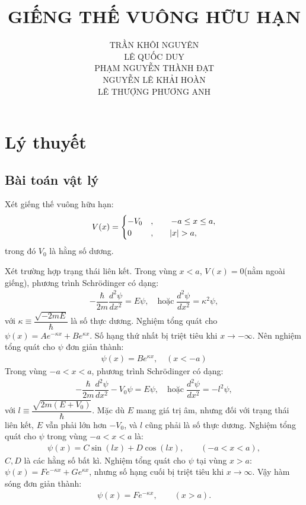 \documentclass{article}
\title{\Huge{GIẾNG THẾ VUÔNG HỮU HẠN}}
\begin{document}
	\setlength{\parindent}{20pt}
	\newpage
	\author{TRẦN KHÔI NGUYÊN \\LÊ QUỐC DUY \\ PHẠM NGUYỄN THÀNH ĐẠT \\NGUYỄN LÊ KHẢI HOÀN \\ LÊ THƯỢNG PHƯƠNG ANH}
	\maketitle
	
	\newpage
	\tableofcontents
	\newpage
	\section{Lý thuyết}
	\subsection{Bài toán vật lý}
	Xét giếng thế vuông hữu hạn:
	\begin{align}
		V(x) = 
		\begin{cases}
			-V_0 &, \quad \quad -a  \leq x \leq a ,\\ 
			0    &, \quad \quad \abs{x} > a,
		\end{cases}
	\end{align}
	trong đó $V_0$ là hằng số dương.
	
	
	
	Xét trường hợp trạng thái liên kết. Trong vùng $x<a$, $V(x) = 0$(nằm ngoài giếng), phương trình Schr\"{o}dinger có dạng:
	\begin{align}
		-\dfrac{\hbar}{2m}\dfrac{d^2\psi}{dx^2} = E \psi, \quad \text{hoặc} \; \dfrac{d^2\psi}{dx^2} = \kappa^2 \psi,
	\end{align}
	với $\kappa \equiv \dfrac{\sqrt{-2mE}}{\hbar}$ là số thực dương. Nghiệm tổng quát cho $\psi(x) = A e^{-\kappa x} + B e^{\kappa x}$. Số hạng thứ nhất bị triệt tiêu khi $x \rightarrow -\infty$. Nên nghiệm tổng quát cho $\psi$ đơn giản thành:
	\begin{align}
		\psi(x) = B e^{\kappa x} , \quad(x< -a)
	\end{align}
	Trong vùng $-a < x < a$, phương trình Schr\"{o}dinger có dạng:
	\begin{align}
		-\dfrac{\hbar}{2m}\dfrac{d^2\psi}{dx^2} - V_0 \psi = E \psi, \quad \text{hoặc} \; \dfrac{d^2\psi}{dx^2} = -l^2 \psi,
	\end{align}
	với $l \equiv \dfrac{\sqrt{2m(E + V_0)}}{\hbar}$. Mặc dù $E$ mang giá trị âm, nhưng đối với trạng thái liên kết, $E$ vẫn phải lớn hơn $-V_0$, và $l$ cũng phải là số thực dương. Nghiệm tổng quát cho $\psi$ trong vùng $-a < x < a$ là:
	\begin{align}
		\psi(x) = C \sin (lx) + D \cos (lx) , \quad \quad ( -a < x < a),
	\end{align}
	$C,D$ là các hằng số bất kì. Nghiệm tổng quát cho $\psi$ tại vùng $x>a$: $\psi(x) = F e^{-\kappa x} + G e^{\kappa x}$, nhưng số hạng cuối bị triệt tiêu khi $x \rightarrow \infty$. Vậy hàm sóng đơn giản thành:
	\begin{align}
		\psi(x) = F e^{-\kappa x}, \quad \quad (x>a).
	\end{align}
\end{document}
